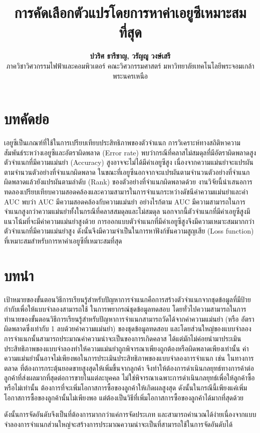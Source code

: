 \documentclass[twoside, twocolumn, 12pt]{article}
\title{\textbf{การคัดเลือกตัวแปรโดยการหาค่าเอยูซีเหมาะสมที่สุด}}
\author{%
\textbf{ปวริศ ธารีชาญ, วรัญญู วงษ์เสรี}\\[1ex]
ภาควิชาวิศวกรรมไฟฟ้าและคอมพิวเตอร์ คณะวิศวกรรมศาสตร์ มหาวิทยาลัยเทคโนโลยีพระจอมเกล้าพระนครเหนือ %
}
\date{}
\begin{document}
\maketitle
\section*{บทคัดย่อ}
\quad เอยูซีเป็นเกณฑ์ที่ใช้ในการเปรียบเทียบประสิทธิภาพของตัวจำแนก การวิเคราะห์ทางสถิติหาความสัมพันธ์ระหว่างเอยูซีและอัตราผิดพลาด (Error rate) พบว่ากรณีที่คลาสไม่สมดุลที่มีอัตราผิดพลาดสูง ตัวจำแนกที่มีความแม่นยำ (Accuracy) สูงอาจจะไม่ได้มีค่าเอยูซีสูง เนื่องจากความแม่นยำจะแปรผันตามจำนวนตัวอย่างที่จำแนกผิดพลาด ในขณะที่เอยูซีนอกจากจะแปรผันตามจำนวนตัวอย่างที่จำแนกผิดพลาดแล้วยังแปรผันตามลำดับ (Rank) ของตัวอย่างที่จำแนกผิดพลาดด้วย งานวิจัยนี้นำเสนอการทดลองเปรียบเทียบความสอดคล้องและความสามารในการจำแนกระหว่างดัชนีค่าความแม่นยำและค่า AUC พบว่า AUC มีความสอดคล้องกับความแม่นยำ อย่างไรก้ตาม AUC มีความสามารถในการจำแนกสูงกว่าความแม่นยำทั้งในกรณีที่คลาสสมดุลและไม่สมดุล นอกจากนี้ตัวจำแนกที่มีค่าเอยูซีสูงมีแนวโน้มที่จะมีค่าความแม่นยำสูงด้วย การออกแบบตัวจำแนกที่มีค่าเอยูซีสูงจึงมีความเหมาะสมมากกว่าตัวจำแนกที่มีความแม่นยำสูง ดังนั้นจึงมีความจำเป็นในการหาฟังก์ชันความสูญเสีย (Loss function) ที่เหมาะสมสำหรับการหาค่าเอยูซีที่เหมาะสมที่สุด
\section{บทนำ}
เป้าหมายของขั้นตอนวิธีการเรียนรู้สำหรับปัญหาการจำแนกคือการสร้างตัวจำแนกจากชุดข้อมูลที่มีป้ายกำกับเพื่อให้แบบจำลองสามารถใช้ ในการพยากรณ์ชุดข้อมูลทดสอบ โดยทั่วไปความสามารถในการทำนายของขั้นตอนวิธีการเรียนรู้สำหรับปัญหาการจำแนกสามารถวัดได้จากค่าความแม่นยำ (หรือ อัตราผิดพลาดซึ่งเท่ากับ 1 ลบด้วยค่าความแม่นยำ) ของชุดข้อมูลทดสอบ และโดยส่วนใหญ่ของแบบจำลองการจำแนกนั้นสามารถประมาณค่าความน่าจะเป็นของการเกิดคลาส ได้แต่มักไม่ค่อยนำมาประเมินประสิทธิภาพของแบบจำลองทำให้ความแม่นยำถูกพิจารณาเพียงถูกต้องหรือผิดพลาดเพียงเท่านั้น 
ค่าความแม่นยำนั้นอาจไม่เพียงพอในการประเมินประสิทธิภาพของแบบจำลองการจำแนก เช่น ในทางการตลาด ที่ต้องการกระตุ้นยอดขายสูงสุดให้เพิ่มขึ้นจากลูกค้า จึงทำให้ต้องการดําเนินกลยุทธ์ทางการค้าต่อลูกค้าที่ส่งผลมากที่สุดต่อการขายในแต่ละบุคคล ไม่ใช่พิจารณาเฉพาะการดำเนินกลยุทธ์เพื่อให้ลูกค้าซื้อหรือไม่เท่านั้น ต้องการที่จะเพิ่มโอกาสการซื้อของลูกค้าให้เกิดผลสูงสุด ดังนั้นในกรณีนี้เพียงแค่เพิ่มโอกาสการซื้อของลูกค้านั้นไม่เพียงพอ แต่ต้องเป็นวิธีที่เพิ่มโอกาสการซื้อของลูกค้าได้มากที่สุดด้วย \cite{1}

ดังนั้นการจัดอันดับจึงเป็นที่ต้องการมากกว่าแค่การจัดประเภท และสามารถคำนวณได้ง่ายเนื่องจากแบบจำลองการจำแนกส่วนใหญ่จะสร้างการประมาณความน่าจะเป็นที่สามารถใช้ในการจัดอันดับได้
\end{document}
